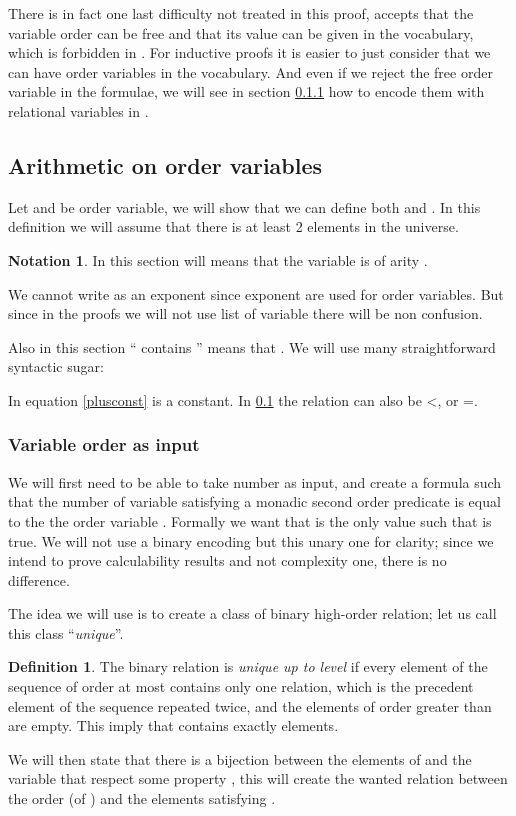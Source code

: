 \documentclass[a4paper,12pt]{article}
\newcommand{\sss}[1]{\subsubsection{#1}}
\newcommand{\emphdex}[1]{\index{#1}\emph{#1}}
\theoremstyle{definition}
\newtheorem{definition}[theorem]{Definition}
\newtheorem{notation}[theorem]{Notation}
\begin{document}
There is in fact one last difficulty not treated in this proof, \VO{}
accepts that the variable order can be free and that its value can be
given in the vocabulary, which is forbidden in . For inductive
proofs it is easier to just consider that we can have order variables
in the vocabulary. And even if we reject the free order variable in
the formulae, we will see in section \ref{fvo} how to encode them with
relational variables in \VO.  

\subsection{Arithmetic on order variables}\label{iter-rel}
Let  and  be order variable, we will show that we can define
both  and . In this definition we will assume that
there is at least 2 elements in the universe.

\begin{notation}
  In this section  will means that the variable  is
  of arity .
\end{notation}
We cannot write  as an exponent since exponent are used for order
variables. But since in the proofs we will not use list of variable
there will be non confusion.

Also in this section `` contains '' means that . We will use many straightforward syntactic sugar:

In equation \ref{plusconst}  is a constant. In \ref{iter-rel} the
relation can also be <,  or =.

\sss{Variable order as input}\label{fvo}
We will first need to be able to take number as input, and create a
formula  such that the number of variable satisfying a monadic
second order predicate  is equal to the the order variable
. Formally we want that  is the only
value such that  is true. We will not use a binary
encoding but this unary one for clarity; since we intend to prove
calculability results and not complexity one, there is no difference.

The idea we will use is to create a class of binary high-order
relation; let us call this class ``\emphdex{unique}''.

\begin{definition}
  The binary relation  is \emph{unique up to level } if every
  element of the sequence  of order at most  contains only
  one relation, which is the precedent element of the sequence
  repeated twice, and the elements of order greater than  are
  empty. This imply that  contains exactly  elements.

\end{definition}
We will then state that there is a bijection between the elements of
 and the variable  that respect some property , this
will create the wanted relation between the order (of ) and the
elements satisfying .
\end{document}
